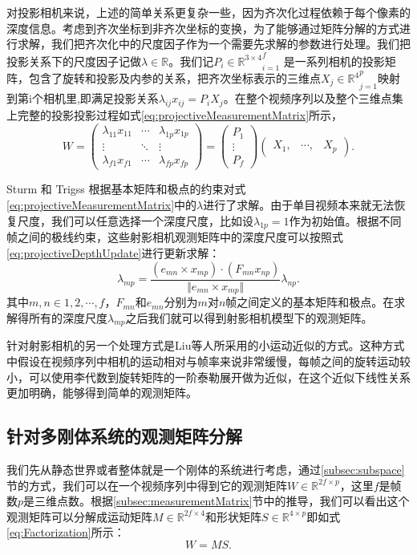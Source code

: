 对投影相机来说，上述的简单关系更复杂一些，因为齐次化过程依赖于每个像素的深度信息\cite{Sturm1996A}。考虑到齐次坐标到非齐次坐标的变换，为了能够通过矩阵分解的方式进行求解，我们把齐次化中的尺度因子作为一个需要先求解的参数进行处理。我们把投影关系下的尺度因子记做$\lambda\in \mathbb{R}$。我们记${P_i\in \mathbb{R}^{3\times4}}_{i=1}^f$ 是一系列相机的投影矩阵，包含了旋转和投影及内参的关系，把齐次坐标表示的三维点${X_j\in \mathbb{R}^4}_{j=1}^p$映射到第i个相机里,即满足投影关系$\lambda_{ij}x_{ij}=P_i X_j$。在整个视频序列以及整个三维点集上完整的投影投影过程如式\eqref{eq:projectiveMeasurementMatrix}所示，
\begin{equation}\label{eq:projectiveMeasurementMatrix}
W=
\begin{pmatrix}
\lambda_{11}x_{11}&\cdots&\lambda_{1p}x_{1p}\\
\vdots&\ddots & \vdots\\
\lambda_{f1}x_{f1}&\cdots&\lambda_{fp}x_{fp}
\end{pmatrix}
=
\begin{pmatrix}
P_1\\
\vdots\\
P_f
\end{pmatrix}
\begin{pmatrix}
X_1,&\cdots,&X_p
\end{pmatrix}.
\end{equation}

Sturm 和 Trigss\cite{Sturm1996A} 根据基本矩阵和极点的约束对式\eqref{eq:projectiveMeasurementMatrix}中的$\lambda$进行了求解。由于单目视频本来就无法恢复尺度，我们可以任意选择一个深度尺度，比如设$\lambda_{1p}=1$作为初始值。根据不同帧之间的极线约束，这些射影相机观测矩阵中的深度尺度可以按照式\eqref{eq:projectiveDepthUpdate}进行更新求解：
\begin{equation}\label{eq:projectiveDepthUpdate}
\lambda_{mp}=\frac{(e_{mn}\times x_{mp})\cdot(F_{mn}x_{np})}{\Vert e_{mn}\times x_{mp}\Vert}\lambda_{np}.
\end{equation} 
其中$m,n\in{1,2,\cdots,f}$，$F_{mn}$和$e_{mn}$分别为$m$对$n$帧之间定义的基本矩阵和极点。在求解得所有的深度尺度$\lambda_{mp}$之后我们就可以得到射影相机模型下的观测矩阵。

针对射影相机的另一个处理方式是Liu等人\cite{Feng2013Joint}所采用的小运动近似的方式。这种方式中假设在视频序列中相机的运动相对与帧率来说非常缓慢，每帧之间的旋转运动较小，可以使用李代数到旋转矩阵的一阶泰勒展开做为近似，在这个近似下线性关系更加明确，能够得到简单的观测矩阵。
\subsection{针对多刚体系统的观测矩阵分解}
我们先从静态世界或者整体就是一个刚体的系统进行考虑，通过\ref{subsec:subspace}节的方式，我们可以在一个视频序列中得到它的观测矩阵$W\in \mathbb{R}^{2f\times p}$，这里$f$是帧数$p$是三维点数。根据\ref{subsec:measurementMatrix}节中的推导，我们可以看出这个观测矩阵可以分解成运动矩阵$M\in \mathbb{R}^{2f\times 4}$和形状矩阵$S\in\mathbb{R}^{4\times p}$即如式\eqref{eq:Factorization}所示：
\begin{equation}\label{eq:Factorization}
W=M S .
\end{equation}

